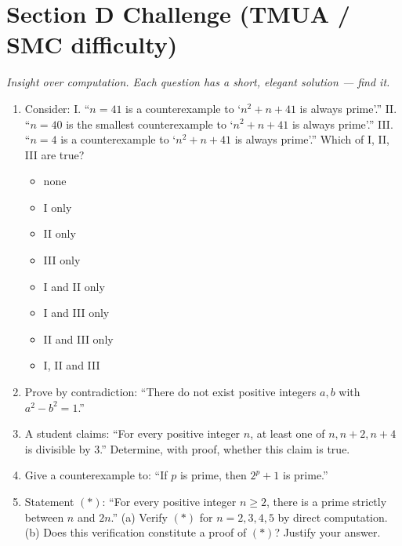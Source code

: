 \documentclass[11pt,a4paper]{article}
\begin{document}
\begin{enumerate}
\end{enumerate}

\section*{Section D \quad Challenge \hfill{\normalfont\small(TMUA / SMC difficulty)}}

\noindent\textit{Insight over computation. Each question has a short, elegant solution --- find it.}

\begin{enumerate}

\item Consider: I. ``$n=41$ is a counterexample to `$n^2+n+41$ is always prime'.'' II. ``$n=40$ is the smallest counterexample to `$n^2+n+41$ is always prime'.'' III. ``$n=4$ is a counterexample to `$n^2+n+41$ is always prime'.'' Which of I, II, III are true?
\begin{itemize}
\item[A)] none
\item[B)] I only
\item[C)] II only
\item[D)] III only
\item[E)] I and II only
\item[F)] I and III only
\item[G)] II and III only
\item[H)] I, II and III
\end{itemize}

\item Prove by contradiction: ``There do not exist positive integers $a,b$ with $a^2-b^2=1$.''

\item A student claims: ``For every positive integer $n$, at least one of $n,n+2,n+4$ is divisible by $3$.'' Determine, with proof, whether this claim is true.

\item Give a counterexample to: ``If $p$ is prime, then $2^p+1$ is prime.''

\item Statement $(*)$: ``For every positive integer $n\geq2$, there is a prime strictly between $n$ and $2n$.'' (a) Verify $(*)$ for $n=2,3,4,5$ by direct computation. (b) Does this verification constitute a proof of $(*)$? Justify your answer.

\end{enumerate}

\end{document}
